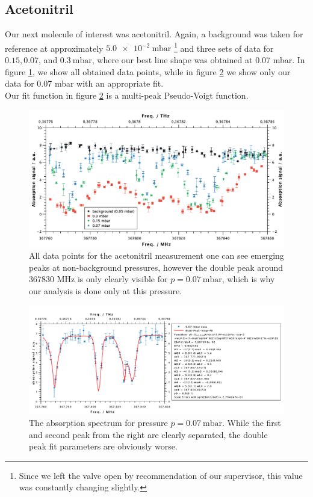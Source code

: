 \documentclass[a4paper,10pt]{scrartcl}
\begin{document}
\subsection{Acetonitril}
Our next molecule of interest was acetonitril. Again, a background was taken for reference at approximately $\SI{5,0e-2}{\milli\bar}$ \footnote{Since we left the valve open by recommendation of our supervisor, this value was constantly changing slightly.} and three sets of data for $\num{0,15},\num{0,07}$, and $\SI{0.3}{\milli\bar}$, where our best line shape was obtained at 0.07 mbar. In figure \ref{fig:aceto_all}, we show all obtained data points, while in figure \ref{fig:aceto_detail} we show only our data for 0.07 mbar with an appropriate fit.\\
Our fit function in figure \ref{fig:aceto_detail} is a multi-peak Pseudo-Voigt function.

\begin{figure}[H]
\centering
\includegraphics[width=\textwidth]{img/aceto_all}
\caption{All data points for the acetonitril measurement one can see emerging peaks at non-background pressures, however the double peak around 367830 MHz is only clearly visible for $p=\SI{0,07}{\milli\bar}$, which is why our analysis is done only at this pressure.}
\label{fig:aceto_all}
\end{figure}

\begin{figure}[H]
\centering
\includegraphics[width=\textwidth]{img/aceto}
\caption[caption]{The absorption spectrum for pressure $p=\SI{0,07}{\milli\bar}$. While the first and second peak from the right are clearly separated, the double peak fit parameters are obviously worse.}
\label{fig:aceto_detail}
\end{figure}
\end{document}
